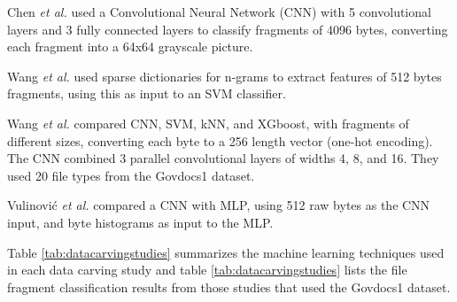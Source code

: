 Chen \textit{et al.} \cite{chen_file_2018}
used a Convolutional Neural Network (CNN) with 5 convolutional layers and 3 fully connected layers to classify fragments of 4096 bytes, converting each fragment into a 64x64 grayscale picture.

Wang \textit{et al.} \cite{wang_sparse_2018} 
used sparse dictionaries for n-grams to extract features of 512 bytes fragments, using this as input to an SVM classifier.

Wang \textit{et al.} \cite{wang_file_2018}  
compared CNN, SVM, kNN, and XGboost, with fragments of different sizes, converting each byte to a 256 length vector (one-hot encoding). The CNN combined 3 parallel convolutional layers of widths 4, 8, and 16.
They used 20 file types from the Govdocs1 dataset.

Vulinović \textit{et al.} \cite{vulinovic_neural_2019}
compared a CNN with MLP, using 512 raw bytes as the CNN input, and byte histograms as input to the MLP.

Table \ref{tab:datacarvingstudies} summarizes the  machine learning techniques used in each data carving study and table  \ref{tab:datacarvingstudies} lists the file fragment classification results from those studies that used the Govdocs1 \cite{garfinkel_bringing_2009} dataset.



